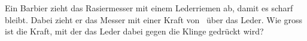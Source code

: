 Ein Barbier zieht das Rasiermesser mit einem Lederriemen ab, damit es scharf bleibt. Dabei zieht er das Messer mit einer Kraft von \FZuO\ über das Leder. Wie gross ist die Kraft, mit der das Leder dabei gegen die Klinge gedrückt wird?
